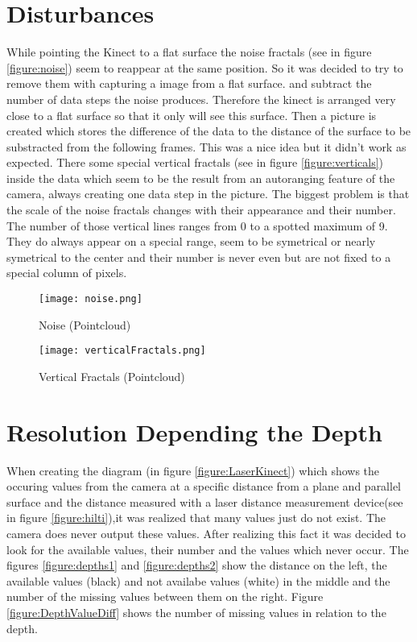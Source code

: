 \section{Disturbances}
While pointing the Kinect to a flat surface the noise fractals (see in figure \vref{figure:noise}) 
seem to reappear at the same position. So it was decided to try to remove them with capturing a image from a flat surface.
and subtract the number of data steps the noise produces. Therefore the kinect is arranged very close to a flat surface 
so that it only will see this surface. Then a picture is created which stores the difference of the data to the 
distance of the surface to be substracted from the following frames.
This was a nice idea but it didn't work as expected. There some special vertical fractals (see in figure \vref{figure:verticals}) 
inside the data which seem to be the result from an autoranging feature of the camera, 
always creating one data step in the picture. The biggest problem is that the scale of the noise fractals changes 
with their appearance and their number. The number of those vertical lines ranges from 0 to a spotted maximum of 9. 
They do always appear on a special range, seem to be symetrical or 
nearly symetrical to the center and their number is never even but are not fixed to a special column of pixels. 
\begin{figure}[htp]
\begin{center}
  \texttt{[image: noise.png]}
  \caption{Noise (Pointcloud)}
  \label{figure:noise}
\end{center}
\end{figure}

\begin{figure}[htp]
\begin{center}
  \texttt{[image: verticalFractals.png]}
  \caption{Vertical Fractals (Pointcloud)}
  \label{figure:verticals}
\end{center}
\end{figure}

\section{Resolution Depending the Depth} \label{resdepDepth}
When creating the diagram (in figure \vref{figure:LaserKinect}) which shows the occuring values from the camera 
at a specific distance from a plane and parallel surface and the distance measured with a laser distance measurement 
device(see in figure \vref{figure:hilti}),it was realized that many values just do not exist. The camera does never output these values.
After realizing this fact it was decided to look for the available values, their number and the values which never occur.
The figures \vref{figure:depths1} and \vref{figure:depths2} show the distance on the left, the available values (black) and 
not availabe values (white) in the middle and the number of the missing values between them on the right. 
Figure \vref{figure:DepthValueDiff} shows the number of missing values in relation to the depth.

